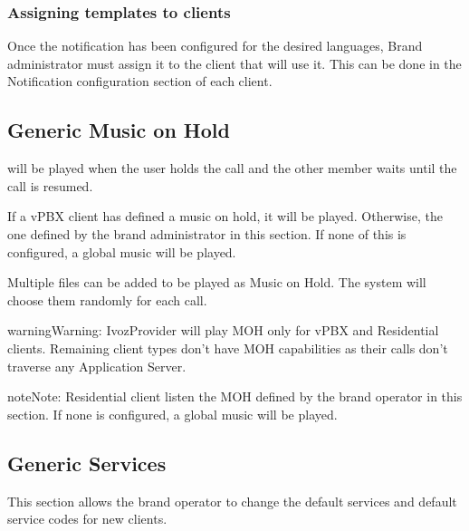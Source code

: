 \documentclass[letterpaper,10pt,english]{sphinxmanual}
\begin{document}
\subsubsection{Assigning templates to clients}
\label{administration_portal/brand/settings/notification_templates:assigning-templates-to-clients}
Once the notification has been configured for the desired languages, Brand administrator must assign it to the
client that will use it. This can be done in the Notification configuration section of each client.


\subsection{Generic Music on Hold}
\label{administration_portal/brand/settings/generic_music_on_hold:generic-music-on-hold}\label{administration_portal/brand/settings/generic_music_on_hold::doc}
{\hyperref[administration_portal/client/vpbx/multimedia/music_on_hold:music\string-on\string-hold]{}} will be played when the user holds the call and the other
member waits until the call is resumed.

If a vPBX client has defined a music on hold, it will be played. Otherwise, the
one defined by the brand administrator in this section. If none of this is configured,
a global music will be played.

Multiple files can be added to be played as Music on Hold. The system will choose them randomly for each call.

\begin{notice}{warning}{Warning:}
IvozProvider will play MOH only for vPBX and Residential clients. Remaining client
types don't have MOH capabilities as their calls don't traverse any Application Server.
\end{notice}

\begin{notice}{note}{Note:}
Residential client listen the MOH defined by the brand operator in this section. If none is configured,
a global music will be played.
\end{notice}


\subsection{Generic Services}
\label{administration_portal/brand/settings/generic_services:generic-services}\label{administration_portal/brand/settings/generic_services::doc}\label{administration_portal/brand/settings/generic_services:brand-services}
This section allows the brand operator to change the default services and default service codes for new clients.
\end{document}
